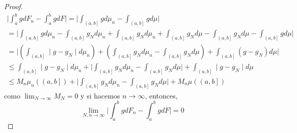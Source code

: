 \begin{proof}
\begin{eqnarray*}
\Bigg|\int_{a}^{b}gdF_{n}-\int_{a}^{b}gdF\Bigg|
=\Bigg|\int_{\left(a,b\right]}gd\mu_{n}-\int_{\left(a,b\right]}gd\mu\Bigg|\\ =\Bigg|\int_{\left(a,b\right]}gd\mu_{n}-\int_{\left(a,b\right]}g_{N}d\mu_{n}+ \int_{\left(a,b\right]}g_{N}d\mu_{n}+\int_{\left(a,b\right]}g_{N}d\mu
-\int_{\left(a,b\right]}g_{N}d\mu-\int_{\left(a,b\right]}gd\mu\Bigg|\\
=\Bigg| \left(\int_{\left(a,b\right]}\mid g-g_{N}\mid d\mu_{n}\right)+
\left(\int_{\left(a,b\right]}g_{N}d\mu_{n}-\int_{\left(a,b\right]}g_{N}d\mu\right)
+ \int_{\left(a,b\right]}\left( g-g_{N}\right) d\mu\Bigg|\\
 \leq \int_{\left(a,b\right]}\mid g-g_{N}\mid d\mu_{n}
+ \Bigg|\int_{\left(a,b\right]}g_{N}d\mu_{n}-\int_{\left(a,b\right]}g_{N}d\mu\Bigg|
+ \int_{\left(a,b\right]}\mid g-g_{N}\mid d\mu\\
\leq M_{n}\mu_{n}\left(\left(a,b\right]\right) + \Bigg|\int_{\left(a,b\right]}g_{N}d\mu_{n}-\int_{\left(a,b\right]}g_{N}d\mu\Bigg|
+ M_{n}\mu\left(\left(a,b\right]\right)
\end{eqnarray*} como $\lim_{N\rightarrow\infty}M_{N}=0$ y si hacemos $n\rightarrow\infty$, entonces,
\[\lim_{N,n\rightarrow\infty}\Bigg|\int_{a}^{b}gdF_{n}-\int_{a}^{b}gdF\Bigg|=0\]
\end{proof}
